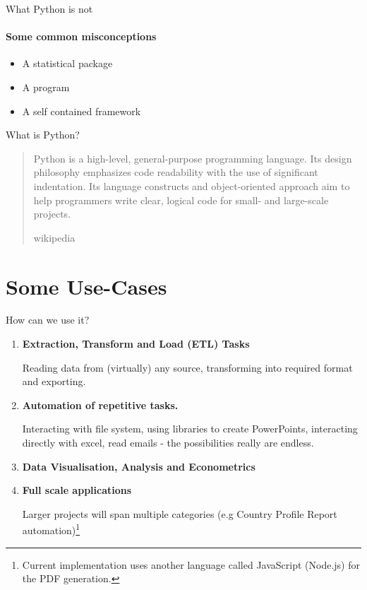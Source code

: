 \documentclass[aspectratio=169]{beamer}
\begin{document}
\begin{frame}{What Python is not}
\framesubtitle{Some common misconceptions}

\begin{itemize}
	\item A statistical package
	\item A program
	\item A self contained framework
\end{itemize}

\end{frame}


\begin{frame}{What is Python?}
\blockquote[wikipedia]{
	Python is a high-level, general-purpose programming language. Its design philosophy emphasizes code readability with the use of significant indentation. Its language constructs and object-oriented approach aim to help programmers write clear, logical code for small- and large-scale projects.}
\end{frame}

\section{Some Use-Cases}

\begin{frame}{How can we use it?}

\begin{enumerate}
	\item \textbf{Extraction, Transform and Load (ETL) Tasks}

			Reading data from (virtually) any source, transforming into required format and exporting.
	
	\item \textbf{Automation of repetitive tasks.}
	
			Interacting with file system, using libraries to create PowerPoints, interacting directly with excel, read emails - the possibilities really are endless.
			
	\item \textbf{Data Visualisation, Analysis and Econometrics}
	
	\item \textbf{Full scale applications}
		
			Larger projects will span multiple categories (e.g Country Profile Report automation)\footnote{Current implementation uses another language called JavaScript (Node.js) for the PDF generation.}
	
\end{enumerate}
	
\end{frame}
\end{document}
